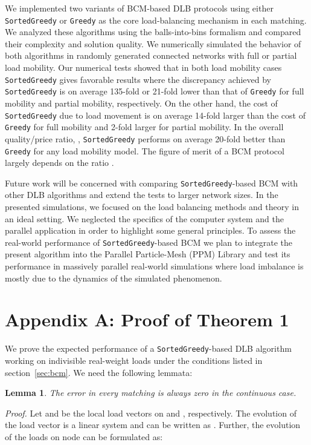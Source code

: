 \documentclass[12pt,psfig,a4]{article}
\newcommand{\sg}{\texttt{SortedGreedy}}
\newcommand{\gr}{\texttt{Greedy}}
\newtheorem{mylemma}{Lemma}
\theoremstyle{plain}
\begin{document}
We implemented two variants of BCM-based DLB protocols using either \sg{} or \gr{} as the core load-balancing mechanism in each matching. We analyzed these algorithms using the balls-into-bins formalism and compared their complexity and solution quality. We numerically simulated the behavior of both algorithms in randomly generated connected networks with full or partial load mobility. Our numerical tests showed that in both load mobility cases \sg{} gives favorable results where the discrepancy achieved by \sg{} is on average 135-fold or 21-fold lower than that of \gr{} for full mobility and partial mobility, respectively. On the other hand, the cost of \sg{} due to load movement is on average 14-fold larger than the cost of \gr{} for full mobility and 2-fold larger for partial mobility. In the overall quality/price ratio, , \sg{} performs on average 20-fold better than \gr{} for any load mobility model. The figure of merit of a BCM protocol largely depends on the ratio . 


Future work will be concerned with comparing \sg{}-based BCM with other DLB algorithms and extend the tests to larger network sizes. 
In the presented simulations, we focused on the load balancing methods and theory in an ideal setting. We neglected the specifics of the computer system and the parallel application in order to highlight some general principles. To assess the real-world performance of \sg{}-based BCM we plan to integrate the present algorithm into the Parallel Particle-Mesh (PPM) Library \cite{sbalzarini2006ppm,sbalzarini2010abstractions,awile2010toward,awile2013domain} and test its performance in massively parallel real-world simulations where load imbalance is mostly due to the dynamics of the simulated phenomenon. 


\newpage

\newpage

\section{Appendix A: Proof of Theorem 1}
\label{sec:proof}
We prove the expected performance of a \sg{}-based DLB algorithm working on indivisible real-weight loads under the conditions listed in section~\ref{sec:bcm}. We need the following lemmata:
\begin{mylemma}
\label{lemma:e_c}
The error  in every matching  is always zero in the \textit{continuous} case.
\end{mylemma}

\textit{Proof.} Let  and  be the local load vectors on  and , respectively. The evolution of the load vector is a linear system and can be written as . Further, the evolution of the loads on node  can be formulated as:
\end{document}
